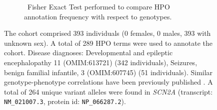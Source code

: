 \begin{figure}[htbp]
\begin{subfigure}[b]{0.95\textwidth}
\end{subfigure}
\vspace{2em}
\begin{subfigure}[b]{0.95\textwidth}
\centering
{}
\captionsetup{justification=raggedright,singlelinecheck=false}
\caption{ Fisher Exact Test performed to compare HPO annotation frequency with respect to genotypes. }
\end{subfigure}

\vspace{2em}

\caption{ The cohort comprised 393 individuals (0 females, 0 males, 393 with unknown sex). A total of 289 HPO terms were used to annotate the cohort. Disease diagnoses: Developmental and epileptic encephalopathy 11 (OMIM:613721) (342 individuals), Seizures, benign familial infantile, 3 (OMIM:607745) (51 individuals). Similar genotype-phenotype correlations have been previously published \cite{PMID_31904126}. A total of 264 unique variant alleles were found in \textit{SCN2A} (transcript: \texttt{NM\_021007.3}, protein id: \texttt{NP\_066287.2}).}
\end{figure}
